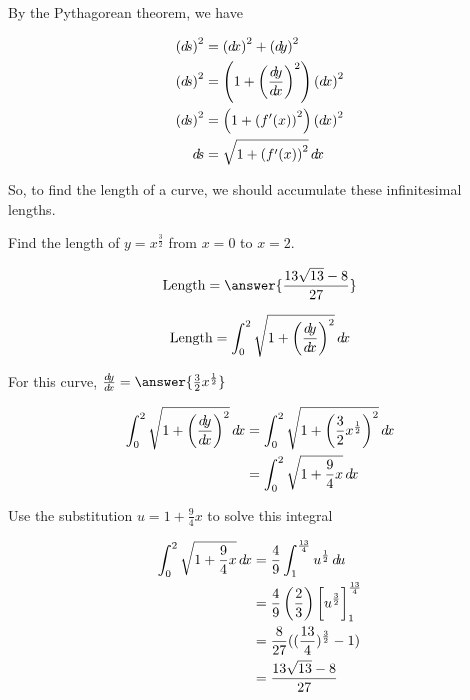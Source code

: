\documentclass{ximera}
\begin{document}
By the Pythagorean theorem, we have

\begin{align*}
	\left( \d s \right)^2 &= \left( \d x \right)^2 + \left( \d y \right)^2\\
	\left( \d s \right)^2 &= \left( 1 + \left( \frac{\d y}{\d x} \right)^2 \right) \left( \d x\right)^2\\
	\left( \d s \right)^2 &= \left( 1 + \left( f'(x) \right)^2 \right) \left( \d x\right)^2\\
	 \d s &= \sqrt{1 + \left( f'(x) \right)^2}\d x
\end{align*}

So, to find the length of a curve, we should accumulate these infinitesimal lengths.

\begin{example}
	Find the length of $y = x^{\frac{3}{2}}$ from $x=0$ to $x=2$.
	
	\[
		\textrm{Length} = \answer{\frac{13\sqrt{13} - 8}{27}}
	\]
	
	\begin{hint}
		\[
		\textrm{Length} = \int_0^2 \sqrt{1+\left( \frac{\mathop{}\!d\! y}{ \mathop{}\!d\! x}\right)^2} \mathop{}\!d\! x
		\]
	\end{hint}
	
	\begin{hint}	
		For this curve, $\frac{\d y}{\d x} = \answer{\frac{3}{2} x^{\frac{1}{2}}}$
	\end{hint}
	
	\begin{hint}
	\begin{align*}
		\int_0^2 \sqrt{1+\left( \frac{\d y}{ \d x}\right)^2} \d x &= \int_0^2 \sqrt{1+\left( \frac{3}{2} x^{\frac{1}{2}}\right)^2} \d x\\
		&= \int_0^2 \sqrt{1+\frac{9}{4} x} \d x
	\end{align*}
	\end{hint}
	\begin{hint}
		Use the substitution $u = 1+\frac{9}{4}x$ to solve this integral
	\end{hint}
	\begin{hint}
		\begin{align*}
		 \int_0^2 \sqrt{1+\frac{9}{4} x} \mathop{}\!d\! x &= \frac{4}{9} \int_1^{\frac{13}{4}} u^\frac{1}{2} \mathop{}\!d\! u\\
		 		&= \frac{4}{9} \left(\frac{2}{3}\right) \bigg[ u^{\frac{3}{2}} \bigg]_1^{\frac{13}{4}}\\
				&=\frac{8}{27} ((\frac{13}{4})^\frac{3}{2} - 1)\\
				&=\frac{13\sqrt{13} - 8}{27}
		\end{align*}
	\end{hint}
\end{example}
\end{document}
